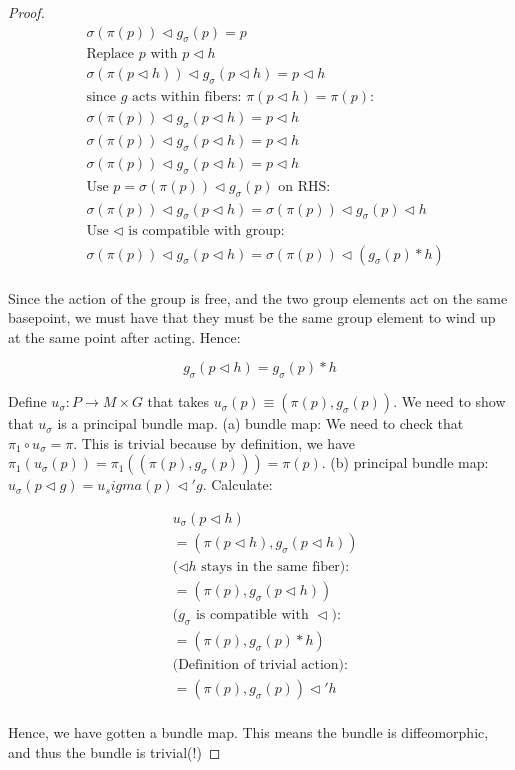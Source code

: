 \documentclass[11pt]{book}
\newtheorem{proof}[theorem]{Proof}
\begin{document}
\begin{proof}
\begin{align*}
&\sigma(\pi(p)) \triangleleft g_\sigma(p) = p \\
&\text{Replace $p$ with $p \triangleleft h$} \\
&\sigma(\pi(p \triangleleft h)) \triangleleft g_\sigma(p \triangleleft h) = p \triangleleft h \\
&\text{since $g$ acts within fibers: $\pi(p \triangleleft h) = \pi(p)$:} \\
&\sigma(\pi(p)) \triangleleft g_\sigma(p \triangleleft h) = p \triangleleft h \\
&\sigma(\pi(p)) \triangleleft g_\sigma(p \triangleleft h) = p \triangleleft h \\
&\sigma(\pi(p)) \triangleleft g_\sigma(p \triangleleft h) = p \triangleleft h \\
&\text{Use $p = \sigma(\pi(p)) \triangleleft g_\sigma(p)$ on RHS:} \\
&\sigma(\pi(p)) \triangleleft g_\sigma(p \triangleleft h) = \sigma(\pi(p)) \triangleleft g_\sigma(p) \triangleleft h \\
&\text{Use $\triangleleft$ is compatible with group:} \\
&\sigma(\pi(p)) \triangleleft g_\sigma(p \triangleleft h) = \sigma(\pi(p)) \triangleleft (g_\sigma(p) * h) \\
\end{align*}

Since the action of the group is free, and the two group elements act on the same basepoint, we must have that
they must be the same group element to wind up at the same point after acting. Hence:

$$g_\sigma(p \triangleleft h) = g_\sigma(p) * h$$


Define $u_\sigma: P \rightarrow M \times G$
that takes $u_\sigma(p) \equiv (\pi(p), g_\sigma(p))$.
We need to show that $u_\sigma$ is a principal bundle map.
(a) bundle map: We need to check that $\pi_1 \circ u_\sigma = \pi$. This is trivial because by definition,
  we have $\pi_1(u_\sigma(p)) = \pi_1((\pi(p), g_\sigma(p))) = \pi(p)$.
(b) principal bundle map: $u_\sigma(p \triangleleft g) = u_sigma(p) \triangleleft' g$. Calculate:


\begin{align*}
&u_\sigma(p \triangleleft h) \\
&= (\pi(p \triangleleft h), g_\sigma(p \triangleleft h)) \\
&\text{($\triangleleft h$ stays in the same fiber):} \\
&= (\pi(p), g_\sigma(p \triangleleft h)) \\
&\text{($g_\sigma$ is compatible with $\triangleleft$):} \\
&= (\pi(p), g_\sigma(p) * h) \\
&\text{(Definition of trivial action):} \\
&= (\pi(p), g_\sigma(p)) \triangleleft' h \\
\end{align*}


Hence, we have gotten a bundle map. This means the bundle is diffeomorphic, and thus
the bundle is trivial(!)
\end{proof}
\end{document}
